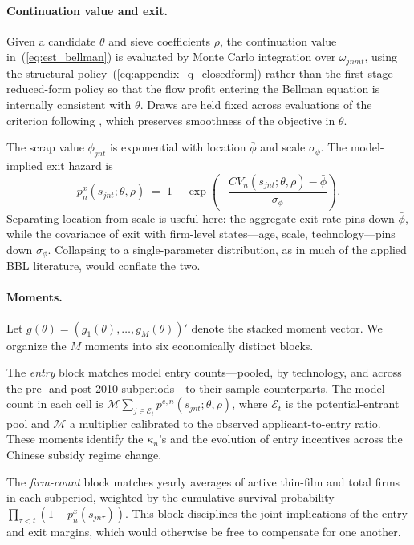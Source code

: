 \documentclass[12pt]{article}
\begin{document}
\paragraph{Continuation value and exit.} Given a candidate $\theta$ and sieve coefficients $\rho$, the continuation value in~(\ref{eq:est_bellman}) is evaluated by Monte Carlo integration over $\omega_{jnmt}$, using the structural policy~(\ref{eq:appendix_q_closedform}) rather than the first-stage reduced-form policy so that the flow profit entering the Bellman equation is internally consistent with $\theta$. Draws are held fixed across evaluations of the criterion following \citet{pakes1989}, which preserves smoothness of the objective in $\theta$.
 
The scrap value $\phi_{jnt}$ is exponential with location $\bar\phi$ and scale $\sigma_\phi$. The model-implied exit hazard is
\begin{equation*}
p^x_n(s_{jnt};\theta,\rho) \;=\; 1 - \exp\!\left(-\frac{CV_n(s_{jnt};\theta,\rho) - \bar\phi}{\sigma_\phi}\right).
\end{equation*}
Separating location from scale is useful here: the aggregate exit rate pins down $\bar\phi$, while the covariance of exit with firm-level states---age, scale, technology---pins down $\sigma_\phi$. Collapsing to a single-parameter distribution, as in much of the applied BBL literature, would conflate the two.
 
\paragraph{Moments.} Let $g(\theta) = (g_1(\theta),\ldots,g_M(\theta))'$ denote the stacked moment vector. We organize the $M$ moments into six economically distinct blocks.
 
The \emph{entry} block matches model entry counts---pooled, by technology, and across the pre- and post-2010 subperiods---to their sample counterparts. The model count in each cell is $\mathcal{M}\sum_{j\in\mathcal{E}_t} p^{e,n}(s_{jnt};\theta,\rho)$, where $\mathcal{E}_t$ is the potential-entrant pool and $\mathcal{M}$ a multiplier calibrated to the observed applicant-to-entry ratio. These moments identify the $\kappa_n$'s and the evolution of entry incentives across the Chinese subsidy regime change.
 
The \emph{firm-count} block matches yearly averages of active thin-film and total firms in each subperiod, weighted by the cumulative survival probability $\prod_{\tau<t}(1-p^x_n(s_{jn\tau}))$. This block disciplines the joint implications of the entry and exit margins, which would otherwise be free to compensate for one another.
 
\end{document}
